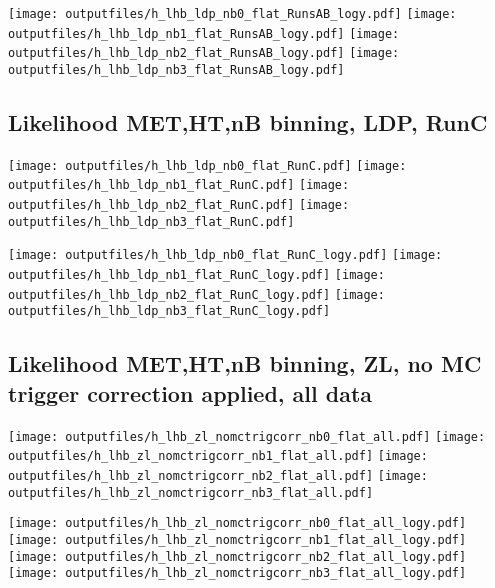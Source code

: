 \documentclass[11pt]{article}
\begin{document}
    \noindent
     \texttt{[image: outputfiles/h\_lhb\_ldp\_nb0\_flat\_RunsAB\_logy.pdf]}
     \texttt{[image: outputfiles/h\_lhb\_ldp\_nb1\_flat\_RunsAB\_logy.pdf]}
     \texttt{[image: outputfiles/h\_lhb\_ldp\_nb2\_flat\_RunsAB\_logy.pdf]}
     \texttt{[image: outputfiles/h\_lhb\_ldp\_nb3\_flat\_RunsAB\_logy.pdf]}

   \clearpage

    \subsection{ Likelihood MET,HT,nB binning, LDP, RunC}

    \noindent
     \texttt{[image: outputfiles/h\_lhb\_ldp\_nb0\_flat\_RunC.pdf]}
     \texttt{[image: outputfiles/h\_lhb\_ldp\_nb1\_flat\_RunC.pdf]}
     \texttt{[image: outputfiles/h\_lhb\_ldp\_nb2\_flat\_RunC.pdf]}
     \texttt{[image: outputfiles/h\_lhb\_ldp\_nb3\_flat\_RunC.pdf]}

    \noindent
     \texttt{[image: outputfiles/h\_lhb\_ldp\_nb0\_flat\_RunC\_logy.pdf]}
     \texttt{[image: outputfiles/h\_lhb\_ldp\_nb1\_flat\_RunC\_logy.pdf]}
     \texttt{[image: outputfiles/h\_lhb\_ldp\_nb2\_flat\_RunC\_logy.pdf]}
     \texttt{[image: outputfiles/h\_lhb\_ldp\_nb3\_flat\_RunC\_logy.pdf]}

   \clearpage

    \subsection{ Likelihood MET,HT,nB binning, ZL, no MC trigger correction applied, all data}

    \noindent
     \texttt{[image: outputfiles/h\_lhb\_zl\_nomctrigcorr\_nb0\_flat\_all.pdf]}
     \texttt{[image: outputfiles/h\_lhb\_zl\_nomctrigcorr\_nb1\_flat\_all.pdf]}
     \texttt{[image: outputfiles/h\_lhb\_zl\_nomctrigcorr\_nb2\_flat\_all.pdf]}
     \texttt{[image: outputfiles/h\_lhb\_zl\_nomctrigcorr\_nb3\_flat\_all.pdf]}

    \noindent
     \texttt{[image: outputfiles/h\_lhb\_zl\_nomctrigcorr\_nb0\_flat\_all\_logy.pdf]}
     \texttt{[image: outputfiles/h\_lhb\_zl\_nomctrigcorr\_nb1\_flat\_all\_logy.pdf]}
     \texttt{[image: outputfiles/h\_lhb\_zl\_nomctrigcorr\_nb2\_flat\_all\_logy.pdf]}
     \texttt{[image: outputfiles/h\_lhb\_zl\_nomctrigcorr\_nb3\_flat\_all\_logy.pdf]}
\end{document}
